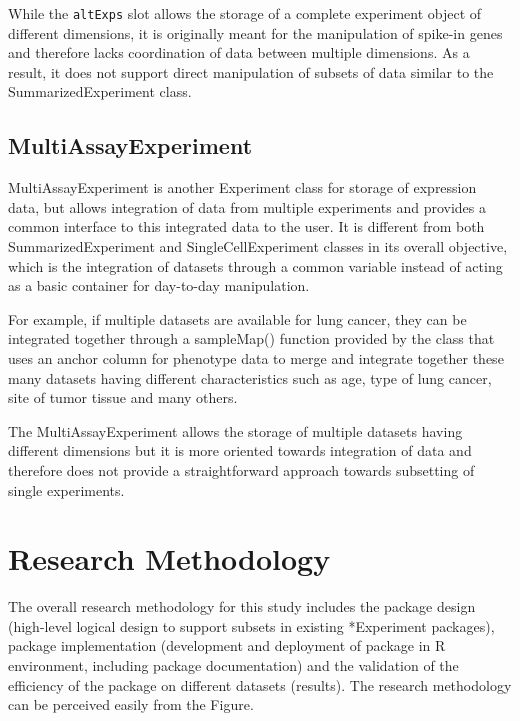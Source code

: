 \documentclass[
]{article}
\begin{document}
While the \texttt{altExps} slot allows the storage of a complete
experiment object of different dimensions, it is originally meant for
the manipulation of spike-in genes and therefore lacks coordination of
data between multiple dimensions. As a result, it does not support
direct manipulation of subsets of data similar to the
SummarizedExperiment class.

\hypertarget{multiassayexperiment}{%
\subsection{MultiAssayExperiment}\label{multiassayexperiment}}

MultiAssayExperiment is another Experiment class for storage of
expression data, but allows integration of data from multiple
experiments and provides a common interface to this integrated data to
the user. It is different from both SummarizedExperiment and
SingleCellExperiment classes in its overall objective, which is the
integration of datasets through a common variable instead of acting as a
basic container for day-to-day manipulation.

For example, if multiple datasets are available for lung cancer, they
can be integrated together through a sampleMap() function provided by
the class that uses an anchor column for phenotype data to merge and
integrate together these many datasets having different characteristics
such as age, type of lung cancer, site of tumor tissue and many others.

The MultiAssayExperiment allows the storage of multiple datasets having
different dimensions but it is more oriented towards integration of data
and therefore does not provide a straightforward approach towards
subsetting of single experiments.

\hypertarget{research-methodology}{%
\section{Research Methodology}\label{research-methodology}}

The overall research methodology for this study includes the package
design (high-level logical design to support subsets in existing
*Experiment packages), package implementation (development and
deployment of package in R environment, including package documentation)
and the validation of the efficiency of the package on different
datasets (results). The research methodology can be perceived easily
from the Figure.
\end{document}
